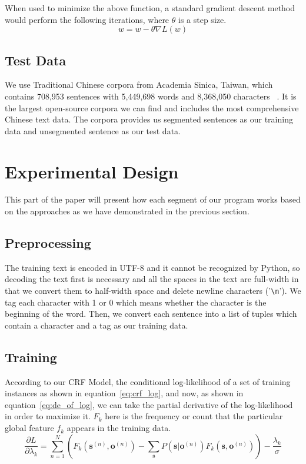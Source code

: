 \documentclass[UTF8,11pt]{article}
\begin{document}
When used to minimize the above function, a standard gradient descent method would perform the following iterations, where $\theta$ is a step size.
\begin{equation}
    w = w - \theta \nabla L (w)
\end{equation}

\subsection{Test Data}
\noindent We use Traditional Chinese corpora from Academia Sinica, Taiwan, which contains 708,953 sentences with 5,449,698 words and 8,368,050 characters~\cite{bakeoff_data} . It is the largest open-source corpora we can find and includes the most comprehensive Chinese text data. The corpora provides us segmented sentences as our training data and unsegmented sentence as our test data.

\section{Experimental Design}
\noindent This part of the paper will present how each segment of our program works based on the approaches as we have demonstrated in the previous section.
\subsection{Preprocessing}
\noindent The training text is encoded in UTF-8 and it cannot be recognized by Python, so decoding the text first is necessary and all the spaces in the text are full-width in that we convert them to half-width space and delete newline characters ('\verb!\n!'). We tag each character with 1 or 0 which means whether the character is the beginning of the word. Then, we convert each sentence into a list of tuples which contain a character and a tag as our training data.

\subsection{Training}
\noindent According to our CRF Model, the conditional log-likelihood of a set of training instances as shown in equation~\ref{eq:crf_log}, and now, as shown in equation~\ref{eq:de_of_log}, we can take the partial derivative of the log-likelihood in order to maximize it. $F_k$ here is the frequency or count that the particular global feature $f_k$ appears in the training data.
\begin{equation} \label{eq:de_of_log}
    \frac{\partial L}{\partial \lambda_k} = \sum_{n=1}^{N} \left( F_k ( \mathbf{s}^{(n)}, \mathbf{o}^{(n)} ) - \sum_{\mathbf{s}} P( \mathbf{s} | \mathbf{o}^{(n)}) F_k ( \mathbf{s}, \mathbf{o}^{(n)} ) \right) - \frac{\lambda_k}{\sigma}
\end{equation}
\end{document}
